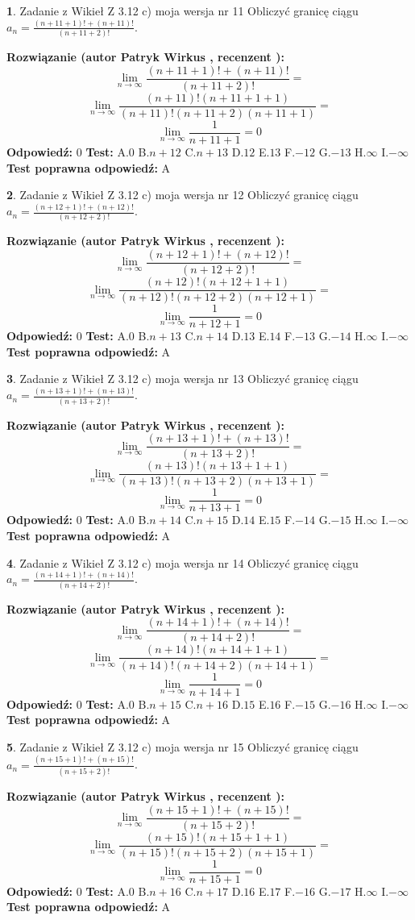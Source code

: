 \documentclass[12pt, a4paper]{article}
\theoremstyle{definition} %
\newtheorem{zad}{}
\newcommand{\zadStart}[1]{\begin{zad}#1\newline}
\newcommand{\zadStop}{\end{zad}}
\newcommand{\rozwStart}[2]{\noindent \textbf{Rozwiązanie (autor #1 , recenzent #2): }\newline}
\newcommand{\rozwStop}{\newline}
\newcommand{\odpStart}{\noindent \textbf{Odpowiedź:}\newline}
\newcommand{\odpStop}{\newline}
\newcommand{\testStart}{\noindent \textbf{Test:}\newline}
\newcommand{\testStop}{\newline}
\newcommand{\kluczStart}{\noindent \textbf{Test poprawna odpowiedź:}\newline}
\newcommand{\kluczStop}{\newline}
\begin{document}
\zadStart{Zadanie z Wikieł Z 3.12 c) moja wersja nr 11}
Obliczyć granicę ciągu $a_{n}=\frac{(n+11+1)!+(n+11)!}{(n+11+2)!}$.
\zadStop
\rozwStart{Patryk Wirkus}{}
$$\lim\limits_{n\to\infty}\frac{(n+11+1)!+(n+11)!}{(n+11+2)!}=$$
$$\lim\limits_{n\to\infty}\frac{(n+11)!(n+11+1+1)}{(n+11)!(n+11+2)(n+11+1)}=$$
$$\lim\limits_{n\to\infty}\frac{1}{n+11+1}= 0$$
\rozwStop
\odpStart
$0$
\odpStop
\testStart
A.$0$
B.$n+12$
C.$n+13$
D.$12$
E.$13$
F.$-12$
G.$-13$
H.$\infty$
I.$-\infty$
\testStop
\kluczStart
A
\kluczStop



\zadStart{Zadanie z Wikieł Z 3.12 c) moja wersja nr 12}
Obliczyć granicę ciągu $a_{n}=\frac{(n+12+1)!+(n+12)!}{(n+12+2)!}$.
\zadStop
\rozwStart{Patryk Wirkus}{}
$$\lim\limits_{n\to\infty}\frac{(n+12+1)!+(n+12)!}{(n+12+2)!}=$$
$$\lim\limits_{n\to\infty}\frac{(n+12)!(n+12+1+1)}{(n+12)!(n+12+2)(n+12+1)}=$$
$$\lim\limits_{n\to\infty}\frac{1}{n+12+1}= 0$$
\rozwStop
\odpStart
$0$
\odpStop
\testStart
A.$0$
B.$n+13$
C.$n+14$
D.$13$
E.$14$
F.$-13$
G.$-14$
H.$\infty$
I.$-\infty$
\testStop
\kluczStart
A
\kluczStop



\zadStart{Zadanie z Wikieł Z 3.12 c) moja wersja nr 13}
Obliczyć granicę ciągu $a_{n}=\frac{(n+13+1)!+(n+13)!}{(n+13+2)!}$.
\zadStop
\rozwStart{Patryk Wirkus}{}
$$\lim\limits_{n\to\infty}\frac{(n+13+1)!+(n+13)!}{(n+13+2)!}=$$
$$\lim\limits_{n\to\infty}\frac{(n+13)!(n+13+1+1)}{(n+13)!(n+13+2)(n+13+1)}=$$
$$\lim\limits_{n\to\infty}\frac{1}{n+13+1}= 0$$
\rozwStop
\odpStart
$0$
\odpStop
\testStart
A.$0$
B.$n+14$
C.$n+15$
D.$14$
E.$15$
F.$-14$
G.$-15$
H.$\infty$
I.$-\infty$
\testStop
\kluczStart
A
\kluczStop



\zadStart{Zadanie z Wikieł Z 3.12 c) moja wersja nr 14}
Obliczyć granicę ciągu $a_{n}=\frac{(n+14+1)!+(n+14)!}{(n+14+2)!}$.
\zadStop
\rozwStart{Patryk Wirkus}{}
$$\lim\limits_{n\to\infty}\frac{(n+14+1)!+(n+14)!}{(n+14+2)!}=$$
$$\lim\limits_{n\to\infty}\frac{(n+14)!(n+14+1+1)}{(n+14)!(n+14+2)(n+14+1)}=$$
$$\lim\limits_{n\to\infty}\frac{1}{n+14+1}= 0$$
\rozwStop
\odpStart
$0$
\odpStop
\testStart
A.$0$
B.$n+15$
C.$n+16$
D.$15$
E.$16$
F.$-15$
G.$-16$
H.$\infty$
I.$-\infty$
\testStop
\kluczStart
A
\kluczStop



\zadStart{Zadanie z Wikieł Z 3.12 c) moja wersja nr 15}
Obliczyć granicę ciągu $a_{n}=\frac{(n+15+1)!+(n+15)!}{(n+15+2)!}$.
\zadStop
\rozwStart{Patryk Wirkus}{}
$$\lim\limits_{n\to\infty}\frac{(n+15+1)!+(n+15)!}{(n+15+2)!}=$$
$$\lim\limits_{n\to\infty}\frac{(n+15)!(n+15+1+1)}{(n+15)!(n+15+2)(n+15+1)}=$$
$$\lim\limits_{n\to\infty}\frac{1}{n+15+1}= 0$$
\rozwStop
\odpStart
$0$
\odpStop
\testStart
A.$0$
B.$n+16$
C.$n+17$
D.$16$
E.$17$
F.$-16$
G.$-17$
H.$\infty$
I.$-\infty$
\testStop
\kluczStart
A
\kluczStop
\end{document}
